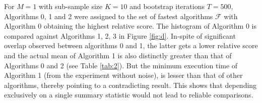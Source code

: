 \documentclass[conference]{IEEEtran}
\begin{document}
For $M=1$  with sub-sample size $K=10$ and bootstrap iterations $T=500$, Algorithms 0, 1 and 2 were assigned to the set of fastest algorithms $\mathcal{F}$ with Algorithm 0 obtaining the highest relative score. The histogram of Algorithm 0 is compared against Algorithms 1, 2, 3 in Figure \ref{fig:d}. In-spite of significant overlap observed between algorithms 0 and 1, the latter gets a lower relative score and the actual mean of Algorithm 1 is also distinctly greater than that of Algorithms 0 and 2 (see Table \ref{tab:2}). But the minimum execution time of Algorithm 1 (from the experiment without noise), is lesser than that of other algorithms,  thereby pointing to a contradicting result. This shows that depending exclusively on a single summary statistic would not lead to reliable comparisons.
\end{document}
